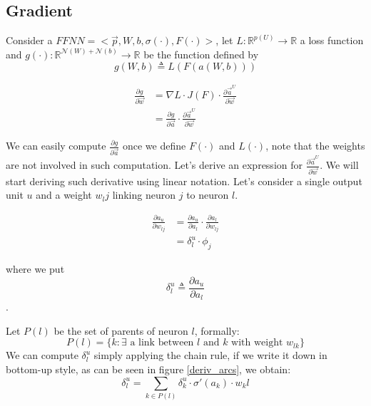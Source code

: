 \subsection{Gradient}
Consider a $FFNN=<\vec{p},W,b,\sigma(\cdot),F(\cdot)>$, let $L:\mathbb{R}^{p(U)} \rightarrow \mathbb{R}$ a loss function and 
$g(\cdot):\mathbb{R}^{\mathcal{N}(W)+\mathcal{N}(b)} \rightarrow \mathbb{R}$ be the function defined by
$$g(W,b) \triangleq L(F(a(W,b)))$$


\begin{align}
\frac{\partial g}{\partial \vec{w}} &= \nabla L \cdot J(F) \cdot \frac{\partial \vec{a}^U}{\partial \vec{w}}\\
&= \frac{\partial g}{\partial \vec{a}} \cdot \frac{\partial \vec{a}^U}{\partial \vec{w}}
\end{align}


We can easily compute $\frac{\partial g}{\partial \vec{a}}$ once we define $F(\cdot)$ and $L(\cdot)$, note that the weights are not involved in such computation.
Let's derive an expression for $\frac{\partial \vec{a}^U}{\partial \vec{w}}$.
We will start deriving such derivative using linear notation. Let's consider a single output unit $u$ and a weight $w_lj$ linking neuron $j$ to neuron $l$.


\begin{align}
\frac{\partial a_u}{\partial w_{lj}} &= \frac{\partial a_u}{\partial a_l} \cdot \frac{\partial a_l}{\partial w_{lj}}\\
&=\delta_l^u \cdot \phi_j
\end{align}

where we put $$\delta_l^u \triangleq \frac{\partial a_u}{\partial a_l}$$.

Let $P(l)$ be the set of parents of neuron $l$, formally:
\begin{equation} 
P(l) = \{ k: \exists \text{ a link between $l$ and $k$ with weight } w_{lk} \}
\end{equation}
We can compute $\delta_l^u$ simply applying the chain rule, if we write it down in bottom-up style, as can be seen in figure \ref{deriv_arcs}, we obtain:
\begin{equation}
\delta_l^u = \sum_{k\in P(l)} \delta_k^u \cdot \sigma'(a_k)\cdot w_kl
\end{equation}

